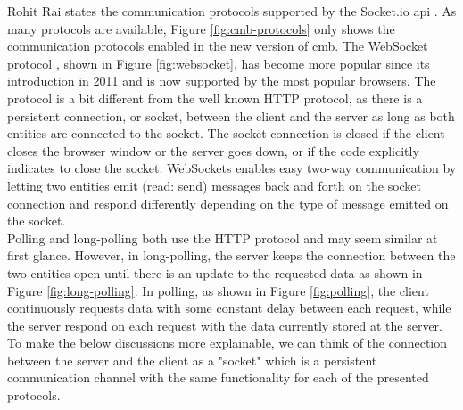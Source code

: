 Rohit Rai states the communication protocols supported by the Socket.io \gls{api} \cite{Rai2013}. As many protocols are available, Figure \ref{fig:cmb-protocols} only shows the communication protocols enabled in the new version of \gls{cmb}. The WebSocket protocol \cite{a:Fette2011}, shown in Figure \ref{fig:websocket}, has become more popular since its introduction in 2011 and is now supported by the most popular browsers. The protocol is a bit different from the well known HTTP protocol, as there is a persistent connection, or socket, between the client and the server as long as both entities are connected to the socket. The socket connection is closed if the client closes the browser window or the server goes down, or if the code explicitly indicates to close the socket. WebSockets enables easy two-way communication by letting two entities emit (read: send) messages back and forth on the socket connection and respond differently depending on the type of message emitted on the socket. \\

Polling and long-polling both use the HTTP protocol and may seem similar at first glance. However, in long-polling, the server keeps the connection between the two entities open until there is an update to the requested data as shown in Figure \ref{fig:long-polling}. In polling, as shown in Figure \ref{fig:polling}, the client continuously requests data with some constant delay between each request, while the server respond on each request with the data currently stored at the server. To make the below discussions more explainable, we can think of the connection between the server and the client as a "socket" which is a persistent communication channel with the same functionality for each of the presented protocols. \\

